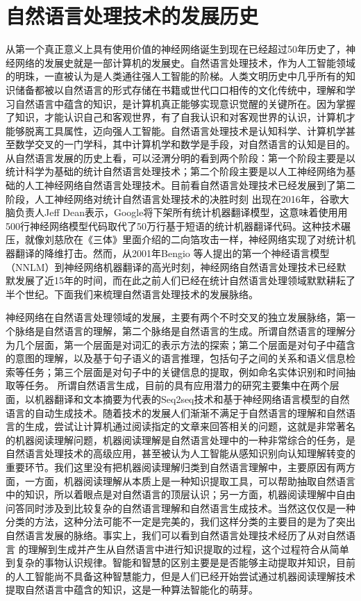 \documentclass[twoside,a4paper,12pt]{book}%
\begin{document}
\chapter{自然语言处理技术的发展历史}
从第一个真正意义上具有使用价值的神经网络诞生到现在已经超过50年历史了，神经网络的发展史就是一部计算机的发展史。自然语言处理技术，作为人工智能领域的明珠，一直被认为是人类通往强人工智能的阶梯。人类文明历史中几乎所有的知识储备都被以自然语言的形式存储在书籍或世代口口相传的文化传统中，理解和学习自然语言中蕴含的知识，是计算机真正能够实现意识觉醒的关键所在。因为掌握了知识，才能认识自己和客观世界，有了自我认识和对客观世界的认识，计算机才能够脱离工具属性，迈向强人工智能。自然语言处理技术是认知科学、计算机学甚至数学交叉的一门学科，其中计算机学和数学是手段，对自然语言的认知是目的。从自然语言发展的历史上看，可以泾渭分明的看到两个阶段：第一个阶段主要是以统计科学为基础的统计自然语言处理技术；第二个阶段主要是以人工神经网络为基础的人工神经网络自然语言处理技术。目前看自然语言处理技术已经发展到了第二阶段，人工神经网络对统计自然语言处理技术的决胜时刻
出现在2016年，谷歌大脑负责人Jeff Dean表示，Google将下架所有统计机器翻译模型，这意味着使用用500行神经网络模型代码取代了50万行基于短语的统计机器翻译代码。这种技术碾压，就像刘慈欣在《三体》里面介绍的二向箔攻击一样，神经网络实现了对统计机器翻译的降维打击。然而，从2001年Bengio 等人提出的第一个神经语言模型（\gls{NNLM}）到神经网络机器翻译的高光时刻，神经网络自然语言处理技术已经默默发展了近15年的时间，而在此之前人们已经在统计自然语言处理领域默默耕耘了半个世纪。下面我们来梳理自然语言处理技术的发展脉络。

神经网络在自然语言处理领域的发展，主要有两个不时交叉的独立发展脉络，第一个脉络是自然语言的理解，第二个脉络是自然语言的生成。所谓自然语言的理解分为几个层面，第一个层面是对词汇的表示方法的探索；第二个层面是对句子中蕴含的意图的理解，以及基于句子语义的语言推理，包括句子之间的关系和语义信息检索等任务；第三个层面是对句子中的关键信息的提取，例如命名实体识别和时间抽取等任务。
所谓自然语言生成，目前的具有应用潜力的研究主要集中在两个层面，以机器翻译和文本摘要为代表的Seq2seq技术和基于神经网络语言模型的自然语言的自动生成技术。随着技术的发展人们渐渐不满足于自然语言的理解和自然语言的生成，尝试让计算机通过阅读指定的文章来回答相关的问题，这就是非常著名的机器阅读理解问题，机器阅读理解是自然语言处理中的一种非常综合的任务，是自然语言处理技术的高级应用，甚至被认为人工智能从感知识别向认知理解转变的重要环节。我们这里没有把机器阅读理解归类到自然语言理解中，主要原因有两方面，一方面，机器阅读理解从本质上是一种知识提取工具，可以帮助抽取自然语言中的知识，所以着眼点是对自然语言的顶层认识；另一方面，机器阅读理解中自由问答同时涉及到比较复杂的自然语言理解和自然语言生成技术。当然这仅仅是一种分类的方法，这种分法可能不一定是完美的，我们这样分类的主要目的是为了突出自然语言发展的脉络。事实上，我们可以看到自然语言处理技术经历了从对自然语言
的理解到生成并产生从自然语言中进行知识提取的过程，这个过程符合从简单到复杂的事物认识规律。智能和智慧的区别主要是是否能够主动提取并知识，目前的人工智能尚不具备这种智慧能力，但是人们已经开始尝试通过机器阅读理解技术提取自然语言中蕴含的知识，这是一种算法智能化的萌芽。
\end{document}
